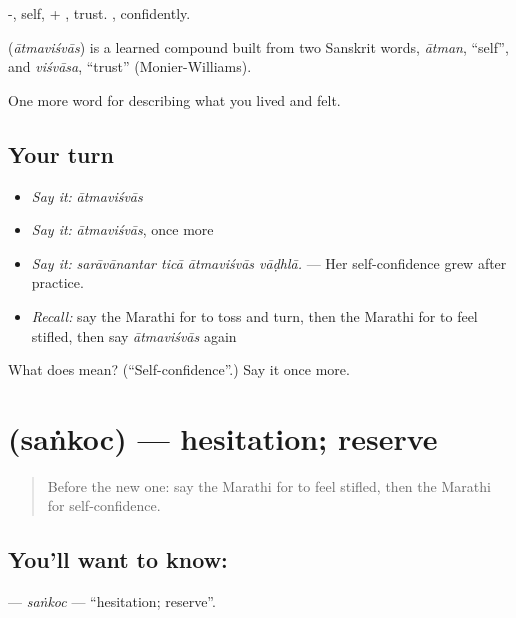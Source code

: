 -, self, + , trust. , confidently.

\begin{cousinweb}
\textbf{} (\emph{ātmaviśvās}) is a learned compound built from two Sanskrit words, \emph{ātman}, \textquotedblleft{}self\textquotedblright{}, and \emph{viśvāsa}, \textquotedblleft{}trust\textquotedblright{} (Monier-Williams).
\end{cousinweb}

\begin{grammarlens}[title={What you've built}]
One more word for describing what you lived and felt.
\end{grammarlens}

\subsection*{Your turn}
\begin{itemize}
\raggedright
  \item \emph{Say it:} \emph{ātmaviśvās}
  \item \emph{Say it:} \emph{ātmaviśvās}, once more
  \item \emph{Say it:} \emph{sarāvānantar ticā ātmaviśvās vāḍhlā.} — Her self-confidence grew after practice.
  \item \emph{Recall:} say the Marathi for to toss and turn, then the Marathi for to feel stifled, then say \emph{ātmaviśvās} again
\end{itemize}

\begin{tcolorbox}[breakable,colback=teal!4,colframe=teal!35!black,title={Before you move on}]
What does  mean? (\textquotedblleft{}Self-confidence\textquotedblright{}.) Say it once more.
\end{tcolorbox}
\section[\texorpdfstring{\mr{संकोच} (saṅkoc)}{संकोच (saṅkoc)}]{ (saṅkoc) — hesitation; reserve}

\label{lesson:MR-C456-sankoc}



\begin{quote}
Before the new one: say the Marathi for to feel stifled, then the Marathi for self-confidence.
\end{quote}

\subsection*{You'll want to know: }
\textbf{} — \emph{saṅkoc} — \textquotedblleft{}hesitation; reserve\textquotedblright{}.

